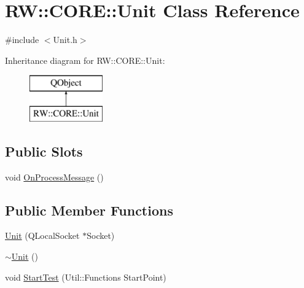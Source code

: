 \hypertarget{class_r_w_1_1_c_o_r_e_1_1_unit}{}\section{RW\+:\+:C\+O\+RE\+:\+:Unit Class Reference}
\label{class_r_w_1_1_c_o_r_e_1_1_unit}


{\ttfamily \#include $<$Unit.\+h$>$}

Inheritance diagram for RW\+:\+:C\+O\+RE\+:\+:Unit\+:\begin{figure}[H]
\begin{center}
\leavevmode
\includegraphics[height=2.000000cm]{class_r_w_1_1_c_o_r_e_1_1_unit}
\end{center}
\end{figure}
\subsection*{Public Slots}
\begin{DoxyCompactItemize}
\item 
void \hyperlink{class_r_w_1_1_c_o_r_e_1_1_unit_ac614ffc786f0c88a3397563414f8914a}{On\+Process\+Message} ()
\end{DoxyCompactItemize}
\subsection*{Public Member Functions}
\begin{DoxyCompactItemize}
\item 
\hyperlink{class_r_w_1_1_c_o_r_e_1_1_unit_a28b0dc765cd31094c074dbad370055bb}{Unit} (Q\+Local\+Socket $\ast$Socket)
\item 
\hyperlink{class_r_w_1_1_c_o_r_e_1_1_unit_ae898e2ef0f245ceb1cae8cae17b8a6f9}{$\sim$\+Unit} ()
\item 
void \hyperlink{class_r_w_1_1_c_o_r_e_1_1_unit_af2a571d5629b2742b603ab88f6c2485c}{Start\+Test} (Util\+::\+Functions Start\+Point)
\end{DoxyCompactItemize}

